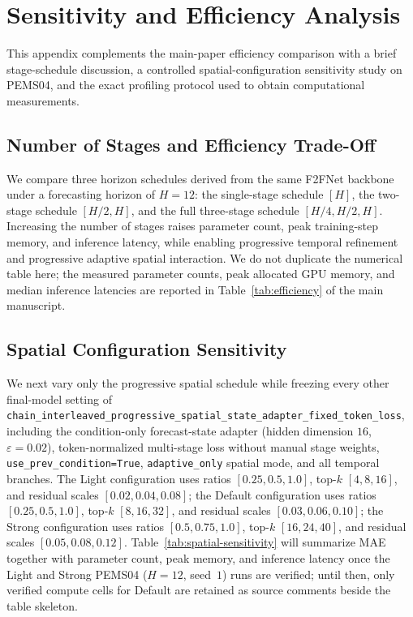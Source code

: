 \section{Sensitivity and Efficiency Analysis}
\label{app:sensitivity-efficiency}

This appendix complements the main-paper efficiency comparison with a brief stage-schedule discussion, a controlled spatial-configuration sensitivity study on PEMS04, and the exact profiling protocol used to obtain computational measurements.

\subsection{Number of Stages and Efficiency Trade-Off}
\label{app:stage-efficiency}

We compare three horizon schedules derived from the same F2FNet backbone under a forecasting horizon of $H{=}12$: the single-stage schedule $[H]$, the two-stage schedule $[H/2,H]$, and the full three-stage schedule $[H/4,H/2,H]$. Increasing the number of stages raises parameter count, peak training-step memory, and inference latency, while enabling progressive temporal refinement and progressive adaptive spatial interaction. We do not duplicate the numerical table here; the measured parameter counts, peak allocated GPU memory, and median inference latencies are reported in Table~\ref{tab:efficiency} of the main manuscript.

\subsection{Spatial Configuration Sensitivity}
\label{app:spatial-sensitivity}

We next vary only the progressive spatial schedule while freezing every other final-model setting of \texttt{chain\_interleaved\_progressive\_spatial\_state\_adapter\_fixed\_token\_loss}, including the condition-only forecast-state adapter (hidden dimension $16$, $\varepsilon{=}0.02$), token-normalized multi-stage loss without manual stage weights, \texttt{use\_prev\_condition{=}True}, \texttt{adaptive\_only} spatial mode, and all temporal branches. The Light configuration uses ratios $[0.25,0.5,1.0]$, top-$k$ $[4,8,16]$, and residual scales $[0.02,0.04,0.08]$; the Default configuration uses ratios $[0.25,0.5,1.0]$, top-$k$ $[8,16,32]$, and residual scales $[0.03,0.06,0.10]$; the Strong configuration uses ratios $[0.5,0.75,1.0]$, top-$k$ $[16,24,40]$, and residual scales $[0.05,0.08,0.12]$. Table~\ref{tab:spatial-sensitivity} will summarize MAE together with parameter count, peak memory, and inference latency once the Light and Strong PEMS04 ($H{=}12$, seed~$1$) runs are verified; until then, only verified compute cells for Default are retained as source comments beside the table skeleton.

